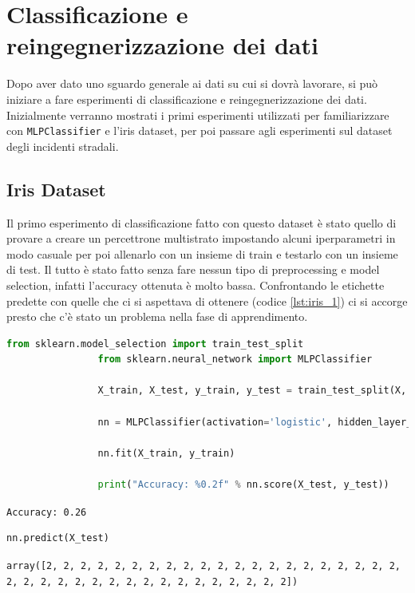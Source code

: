\documentclass[12pt, twoside, letterpaper]{report}
\begin{document}
	\section{Classificazione e reingegnerizzazione dei dati} 
		Dopo aver dato uno sguardo generale ai dati su cui si dovrà lavorare, si può iniziare a fare esperimenti di classificazione e reingegnerizzazione dei dati. Inizialmente verranno mostrati i primi esperimenti utilizzati per familiarizzare con \texttt{MLPClassifier} e l'iris dataset, per poi passare agli esperimenti sul dataset degli incidenti stradali. 
		
		\subsection{Iris Dataset}
			Il primo esperimento di classificazione fatto con questo dataset è stato quello di provare a creare un percettrone multistrato impostando alcuni iperparametri in modo casuale per poi allenarlo con un insieme di train e testarlo con un insieme di test. Il tutto è stato fatto senza fare nessun tipo di preprocessing e model selection, infatti l'accuracy ottenuta è molto bassa. Confrontando le etichette predette con quelle che ci si aspettava di ottenere (codice \ref{lst:iris_1}) ci si accorge presto che c'è stato un problema nella fase di apprendimento. 

			\begin{lstlisting}[language=Python, caption=Primo esperimento con l'iris dataset, captionpos=t, gobble=8, label={lst:iris_1}]
				from sklearn.model_selection import train_test_split
				from sklearn.neural_network import MLPClassifier
				
				X_train, X_test, y_train, y_test = train_test_split(X, y)
				
				nn = MLPClassifier(activation='logistic', hidden_layer_sizes=(2), learning_rate_init=0.5, max_iter=500)
				
				nn.fit(X_train, y_train)
				
				print("Accuracy: %0.2f" % nn.score(X_test, y_test))
			\end{lstlisting}
			\texttt{Accuracy: 0.26}
			
			 
			\begin{lstlisting}[language=Python, gobble=8]
				nn.predict(X_test)
			\end{lstlisting}
			\texttt{array([2, 2, 2, 2, 2, 2, 2, 2, 2, 2, 2, 2, 2, 2, 2, 2, 2, 2, 2, 2, 2, 2, 2, 2, 2, 2, 2, 2, 2, 2, 2, 2, 2, 2, 2, 2, 2, 2])}
			
\end{document}
